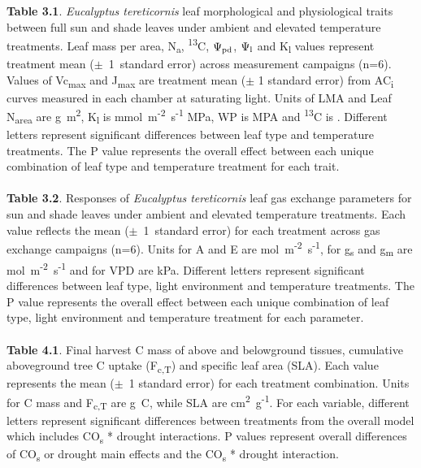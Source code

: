 \documentclass[a4paper]{article}
\begin{document}
\textbf{Table 3.1}. \textit{Eucalyptus tereticornis} leaf morphological and physiological traits between full sun and shade leaves under ambient and elevated temperature treatments. Leaf mass per area, N\textsubscript{a}, {\textdelta}\textsuperscript{13}C, $\Psi\textsubscript{pd}$, $\Psi\textsubscript{l}$ and K\textsubscript{l} values represent treatment mean ($\pm$~1~standard error) across measurement campaigns (n=6). Values of Vc\textsubscript{max} and J\textsubscript{max} are treatment mean ($\pm$ 1 standard error) from AC\textsubscript{i} curves measured in each chamber at saturating light. Units of LMA and Leaf N\textsubscript{area} are g~m\textsuperscript{2}, K\textsubscript{l} is mmol~m\textsuperscript{-2}~s\textsuperscript{-1} MPa, WP is MPA and {\textdelta}\textsuperscript{13}C is \permil. Different letters represent significant differences between leaf type and temperature treatments. The P value represents the overall effect between each unique combination of leaf type and temperature treatment for each trait.
\\
\\
\textbf{Table 3.2}. Responses of \textit{Eucalyptus tereticornis} leaf gas exchange parameters for sun and shade leaves under ambient and elevated temperature treatments. Each value reflects the mean ($\pm$~1~standard error) for each treatment across gas exchange campaigns (n=6). Units for A and E are {\textmugreek}mol~m\textsuperscript{-2}~s\textsuperscript{-1}, for g\textsubscript{s} and g\textsubscript{m} are mol~m\textsuperscript{-2}~s\textsuperscript{-1} and for VPD are kPa. Different letters represent significant differences between leaf type, light environment and temperature treatments. The P value represents the overall effect between each unique combination of leaf type, light environment and temperature treatment for each parameter.
\\
\\
\textbf{Table 4.1}. Final harvest C mass of above and belowground tissues, cumulative aboveground tree C uptake (F\textsubscript{c,T}) and specific leaf area (SLA). Each value represents the mean ($\pm$~1 standard error) for each treatment combination. Units for C mass and F\textsubscript{c,T} are g~C, while SLA are cm\textsuperscript{2}~g\textsuperscript{-1}. For each variable, different letters represent significant differences between treatments from the overall model which includes CO\textsubscript{s} * drought interactions. P values represent overall differences of CO\textsubscript{s} or drought main effects and the CO\textsubscript{s} * drought interaction.
   
\end{document}
